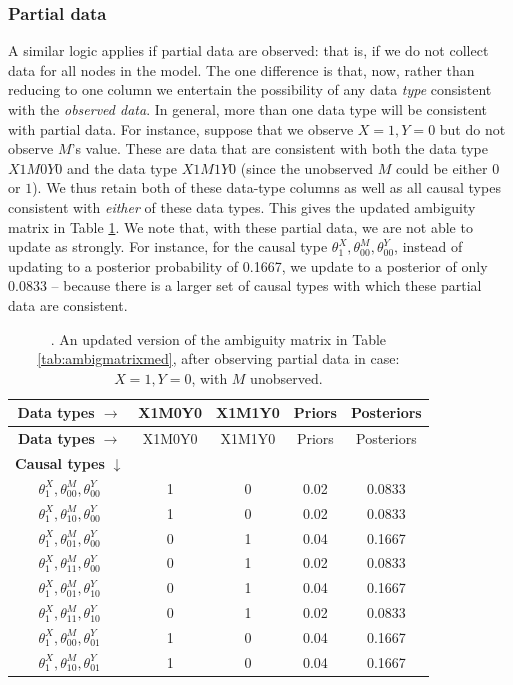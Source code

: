 \documentclass[
  12pt,
]{book}
\begin{document}
\hypertarget{partial-data}{%
\subsubsection{Partial data}\label{partial-data}}

A similar logic applies if partial data are observed: that is, if we do not collect data for all nodes in the model. The one difference is that, now, rather than reducing to one column we entertain the possibility of any data \emph{type} consistent with the \emph{observed data}. In general, more than one data type will be consistent with partial data. For instance, suppose that we observe \(X=1, Y=0\) but do not observe \(M\)'s value. These are data that are consistent with both the data type \(X1M0Y0\) and the data type \(X1M1Y0\) (since the unobserved \(M\) could be either \(0\) or \(1\)). We thus retain both of these data-type columns as well as all causal types consistent with \emph{either} of these data types. This gives the updated ambiguity matrix in Table \ref{tab:ambigmedupdatepartial}. We note that, with these partial data, we are not able to update as strongly. For instance, for the causal type \(\theta^X_1,\theta^M_{00},\theta^Y_{00}\), instead of updating to a posterior probability of 0.1667, we update to a posterior of only 0.0833 -- because there is a larger set of causal types with which these partial data are consistent.

\begin{longtable}[]{@{}ccccc@{}}
\caption{\label{tab:ambigmedupdatepartial}. An updated version of the ambiguity matrix in Table \ref{tab:ambigmatrixmed}, after observing partial data in case: \(X=1, Y=0\), with \(M\) unobserved.}\tabularnewline
\toprule
\textbf{Data types} \(\rightarrow\) & X1M0Y0 & X1M1Y0 & Priors & Posteriors \\
\midrule
\endfirsthead
\toprule
\textbf{Data types} \(\rightarrow\) & X1M0Y0 & X1M1Y0 & Priors & Posteriors \\
\midrule
\endhead
\textbf{Causal types} \(\downarrow\) & & & & \\
\(\theta^X_1,\theta^M_{00},\theta^Y_{00}\) & 1 & 0 & 0.02 & 0.0833 \\
\(\theta^X_1,\theta^M_{10},\theta^Y_{00}\) & 1 & 0 & 0.02 & 0.0833 \\
\(\theta^X_1,\theta^M_{01},\theta^Y_{00}\) & 0 & 1 & 0.04 & 0.1667 \\
\(\theta^X_1,\theta^M_{11},\theta^Y_{00}\) & 0 & 1 & 0.02 & 0.0833 \\
\(\theta^X_1,\theta^M_{01},\theta^Y_{10}\) & 0 & 1 & 0.04 & 0.1667 \\
\(\theta^X_1,\theta^M_{11},\theta^Y_{10}\) & 0 & 1 & 0.02 & 0.0833 \\
\(\theta^X_1,\theta^M_{00},\theta^Y_{01}\) & 1 & 0 & 0.04 & 0.1667 \\
\(\theta^X_1,\theta^M_{10},\theta^Y_{01}\) & 1 & 0 & 0.04 & 0.1667 \\
\bottomrule
\end{longtable}
\end{document}
